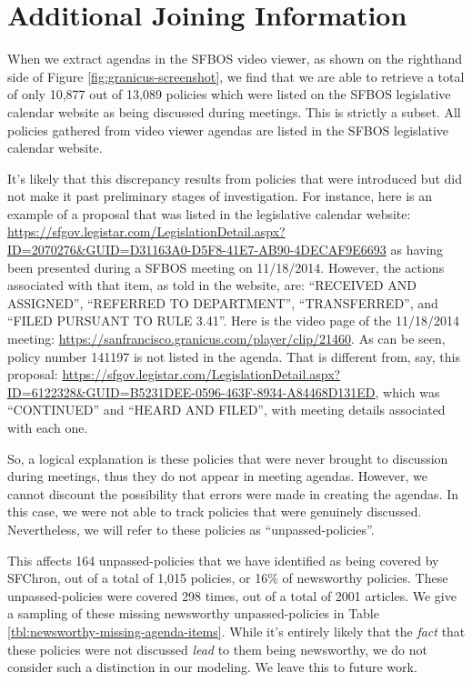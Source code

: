 \documentclass[11pt]{article}
\begin{document}
\section{Additional Joining Information}
\label{sct:missing-policies}

When we extract agendas in the SFBOS video viewer, as shown on the righthand side of Figure \ref{fig:granicus-screenshot}, we find that we are able to retrieve a total of only 10,877 out of 13,089 policies which were listed on the SFBOS legislative calendar website as being discussed during meetings. This is strictly a subset. All policies gathered from video viewer agendas are listed in the SFBOS legislative calendar website.

It's likely that this discrepancy results from policies that were introduced but did not make it past preliminary stages of investigation. For instance, here is an example of a proposal that was listed in the legislative calendar website: \url{https://sfgov.legistar.com/LegislationDetail.aspx?ID=2070276&GUID=D31163A0-D5F8-41E7-AB90-4DECAF9E6693} as having been presented during a SFBOS meeting on 11/18/2014. However, the actions associated with that item, as told in the website, are: ``RECEIVED AND ASSIGNED'', ``REFERRED TO DEPARTMENT'', ``TRANSFERRED'', and ``FILED PURSUANT TO RULE 3.41''. Here is the video page of the 11/18/2014 meeting: \url{https://sanfrancisco.granicus.com/player/clip/21460}. As can be seen, policy number 141197 is not listed in the agenda. That is different from, say, this proposal: \url{https://sfgov.legistar.com/LegislationDetail.aspx?ID=6122328&GUID=B5231DEE-0596-463F-8934-A84468D131ED}, which was ``CONTINUED'' and ``HEARD AND FILED'', with meeting details associated with each one. 

So, a logical explanation is these policies that were never brought to discussion during meetings, thus they do not appear in meeting agendas. However, we cannot discount the possibility that errors were made in creating the agendas. In this case, we were not able to track policies that were genuinely discussed. Nevertheless, we will refer to these policies as ``unpassed-policies''.

This affects 164 unpassed-policies that we have identified as being covered by SFChron, out of a total of 1,015 policies, or 16\% of newsworthy policies. These unpassed-policies were covered 298 times, out of a total of 2001 articles. We give a sampling of these missing newsworthy unpassed-policies in Table \ref{tbl:newsworthy-missing-agenda-items}. While it's entirely likely that the \textit{fact} that these policies were not discussed \textit{lead} to them being newsworthy, we do not consider such a distinction in our modeling. We leave this to future work.
\end{document}

